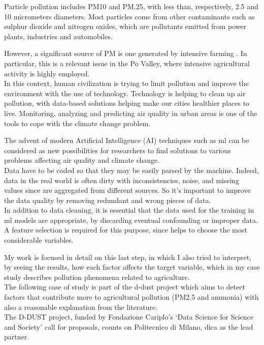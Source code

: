 Particle pollution includes PM10 and PM.25, with less than, respectively, 2.5 and 10 micrometers diameters.
Most particles come from other contaminants such as sulphur dioxide and nitrogen oxides, which are pollutants emitted from power plants, industries and automobiles.\par
However, a significant source of PM is one generated by intensive farming \cite{burkart2007diffuse}.
In particular, this is a relevant issue in the Po Valley, where intensive agricultural activity is highly employed.\\
In this context, human civilization is trying to limit pollution and improve the environment with the use of technology.\newline
Technology is helping to clean up air pollution, with data-based solutions helping make our cities healthier places to live.\newline
Monitoring, analyzing and predicting air quality in urban areas is one of the tools to cope with the climate change problem.\par
The advent of modern Artificial Intelligence (AI) techniques such as \gls{ml} can be considered as new possibilities for researchers to find solutions to various problems affecting air quality and climate change.
\\  
Data have to be coded so that they may be easily parsed by the machine. 
Indeed, data in the real world is often dirty with inconsistencies, noise, and missing values since are aggregated from different sources. So it's important to improve the data quality by removing redundant and wrong pieces of data.\\
In addition to data cleaning, it is essential that the data used for the training in \acrshort{ml} models are appropriate, by discarding eventual confounding or improper data.\\
A feature selection is required for this purpose, since helps to choose the most considerable variables.\par
My work is focused in detail on this last step, in which I also tried to interpret, by seeing the results, how each factor affects the target variable, which in my case study describes pollution phenomena related to agriculture.\\
The following case of study is part of the \gls{d-dust} project which aims to detect factors that contribute more to agricultural pollution (PM2.5 and ammonia) with also a reasonable explanation from the literature.\\
The D-DUST project, funded by Fondazione Cariplo’s ‘Data Science for Science and Society’ call for proposals, counts on Politecnico di Milano, \gls{dica} as the lead partner.\newline
